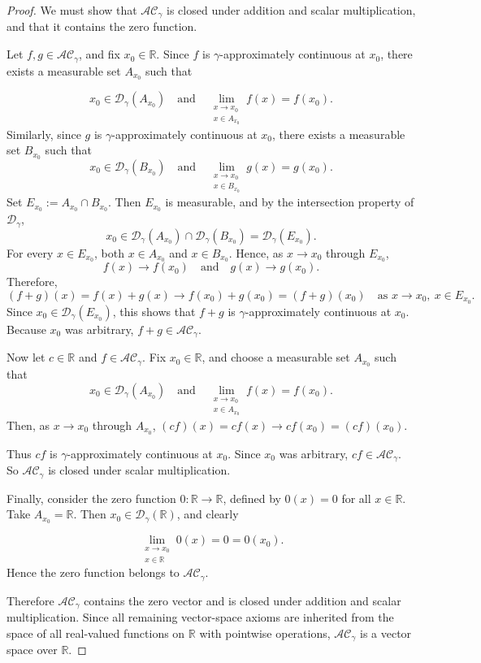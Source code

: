 \documentclass{amsart}
\theoremstyle{plain}
\numberwithin{equation}{section}
\begin{document}
\begin{proof}
We must show that $\mathcal{AC}_\gamma$ is closed under addition and scalar multiplication, and that it contains the zero function.

Let $f,g\in \mathcal{AC}_\gamma$, and fix $x_0\in \mathbb{R}$. Since $f$ is $\gamma$-approximately continuous at $x_0$, there exists a measurable set $A_{x_0}$ such that

$$
x_0\in \mathcal{D}_\gamma(A_{x_0})
\quad \text{and} \quad
\lim_{\substack{x\to x_0\\ x\in A_{x_0}}} f(x)=f(x_0).
$$
Similarly, since $g$ is $\gamma$-approximately continuous at $x_0$, there exists a measurable set $B_{x_0}$ such that
$$
x_0\in \mathcal{D}_\gamma(B_{x_0})
\quad \text{and} \quad
\lim_{\substack{x\to x_0\\ x\in B_{x_0}}} g(x)=g(x_0).
$$
Set $ E_{x_0}:=A_{x_0}\cap B_{x_0}. $ Then $E_{x_0}$ is measurable, and by the intersection property of $\mathcal{D}_\gamma$,
$$ x_0\in \mathcal{D}_\gamma(A_{x_0})\cap \mathcal{D}_\gamma(B_{x_0})=\mathcal{D}_\gamma(E_{x_0}). $$
For every $x\in E_{x_0}$, both $x\in A_{x_0}$ and $x\in B_{x_0}$. Hence, as $x\to x_0$ through $E_{x_0}$,
$$f(x)\to f(x_0) \quad \text{and} \quad g(x)\to g(x_0). $$
Therefore,
$$ (f+g)(x)=f(x)+g(x)\to f(x_0)+g(x_0)=(f+g)(x_0) \quad \text{as } x\to x_0,\ x\in E_{x_0}. $$
Since $x_0\in \mathcal{D}_\gamma(E_{x_0})$, this shows that $f+g$ is $\gamma$-approximately continuous at $x_0$. Because $x_0$ was arbitrary, $f+g\in \mathcal{AC}_\gamma$.

Now let $c\in \mathbb{R}$ and $f\in \mathcal{AC}_\gamma$. Fix $x_0\in \mathbb{R}$, and choose a measurable set $A_{x_0}$ such that $$ x_0\in \mathcal{D}_\gamma(A_{x_0})
\quad \text{and} \quad
\lim_{\substack{x\to x_0\\ x\in A_{x_0}}} f(x)=f(x_0).$$
Then, as $x\to x_0$ through $A_{x_0}$,
$(cf)(x)=cf(x)\to cf(x_0)=(cf)(x_0).$

Thus $cf$ is $\gamma$-approximately continuous at $x_0$. Since $x_0$ was arbitrary, $cf\in \mathcal{AC}_\gamma$. So $\mathcal{AC}_\gamma$ is closed under scalar multiplication.

Finally, consider the zero function $0:\mathbb{R}\to\mathbb{R}$, defined by $0(x)=0$ for all $x\in \mathbb{R}$. Take $A_{x_0}=\mathbb{R}$. Then $x_0\in \mathcal{D}_\gamma(\mathbb{R})$, and clearly

$$
\lim_{\substack{x\to x_0\\ x\in \mathbb{R}}} 0(x)=0=0(x_0).
$$
Hence the zero function belongs to $\mathcal{AC}_\gamma$.

Therefore $\mathcal{AC}_\gamma$ contains the zero vector and is closed under addition and scalar multiplication. Since all remaining vector-space axioms are inherited from the space of all real-valued functions on $\mathbb{R}$ with pointwise operations, $\mathcal{AC}_\gamma$ is a vector space over $\mathbb{R}$.
\end{proof}
\end{document}
